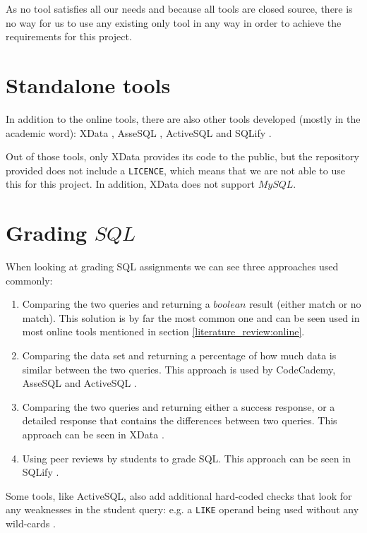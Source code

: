 As no tool satisfies all our needs and because all tools are closed source,
there is no way for us to use any existing only tool in any way in order to
achieve the requirements for this project.

\section{Standalone tools}

In addition to the online tools, there are also other tools developed (mostly
in the academic word): XData \cite{literature:xdata}, AsseSQL
\cite{literature:assesql}, ActiveSQL \cite{literature:activesql} and
SQLify \cite{literature:sqlify}.

Out of those tools, only XData provides its code to the public, but the
repository provided does not include a \texttt{LICENCE}, which means that we are not
able to use this for this project. In addition, XData does not support $MySQL$.

\section{Grading $SQL$}
When looking at grading SQL assignments we can see three approaches used commonly:

\begin{enumerate}
    \item Comparing the two queries and returning a $boolean$ result (either match
    or no match). This solution is by far the most common one and can be seen
    used in most online tools mentioned in section \ref{literature_review:online}.
    \item Comparing the data set and returning a percentage of how much data
    is similar between the two queries. This approach is used by CodeCademy,
    AsseSQL and ActiveSQL
    \cite{literature:assesql,literature:activesql}.
    \item Comparing the two queries and returning either a success response, or
    a detailed response that contains the differences between two queries. This
    approach can be seen in XData \cite{literature:xdata}.
    \item Using peer reviews by students to grade SQL. This approach can be
    seen in SQLify \cite{literature:sqlify}.
\end{enumerate}
Some tools, like ActiveSQL, also add additional hard-coded checks that look
for any weaknesses in the student query: e.g. a \texttt{LIKE} operand being used
without any wild-cards \cite{literature:activesql}.

